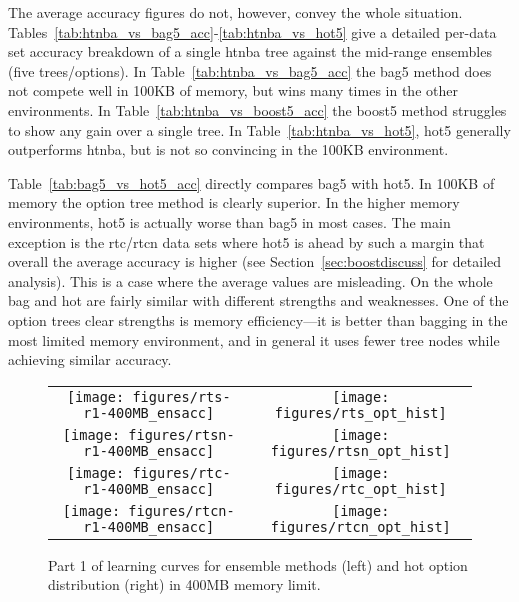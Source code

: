 The average accuracy figures do not, however, convey the whole situation. Tables~\ref{tab:htnba_vs_bag5_acc}-\ref{tab:htnba_vs_hot5} give a detailed per-data set accuracy breakdown of a single {\sc htnba} tree against the mid-range ensembles (five trees/options). In Table~\ref{tab:htnba_vs_bag5_acc} the {\sc bag5} method does not compete well in 100KB of memory, but wins many times in the other environments. In Table~\ref{tab:htnba_vs_boost5_acc} the {\sc boost5} method struggles to show any gain over a single tree. In Table~\ref{tab:htnba_vs_hot5}, {\sc hot5} generally outperforms {\sc htnba}, but is not so convincing in the 100KB environment.

Table~\ref{tab:bag5_vs_hot5_acc} directly compares {\sc bag5} with {\sc hot5}. In 100KB of memory the option tree method is clearly superior. In the higher memory environments, {\sc hot5} is actually worse than {\sc bag5} in most cases. The main exception is the {\sc rtc}/{\sc rtcn} data sets where {\sc hot5} is ahead by such a margin that overall the average accuracy is higher (see Section~\ref{sec:boostdiscuss} for detailed analysis). This is a case where the average values are misleading. On the whole {\sc bag} and {\sc hot} are fairly similar with different strengths and weaknesses. One of the option trees clear strengths is memory efficiency---it is better than bagging in the most limited memory environment, and in general it uses fewer tree nodes while achieving similar accuracy.

\begin{figure}
\centering
\begin{tabular}{c@{}c}
\texttt{[image: figures/rts-r1-400MB\_ensacc]} &
\texttt{[image: figures/rts\_opt\_hist]} \\
\texttt{[image: figures/rtsn-r1-400MB\_ensacc]} &
\texttt{[image: figures/rtsn\_opt\_hist]} \\
\texttt{[image: figures/rtc-r1-400MB\_ensacc]} &
\texttt{[image: figures/rtc\_opt\_hist]} \\
\texttt{[image: figures/rtcn-r1-400MB\_ensacc]} &
\texttt{[image: figures/rtcn\_opt\_hist]} \\
\end{tabular}
\caption{Part 1 of learning curves for ensemble methods (left) and {\sc hot} option distribution (right) in 400MB memory limit.}
\label{fig:400MB_ens1}
\end{figure}


